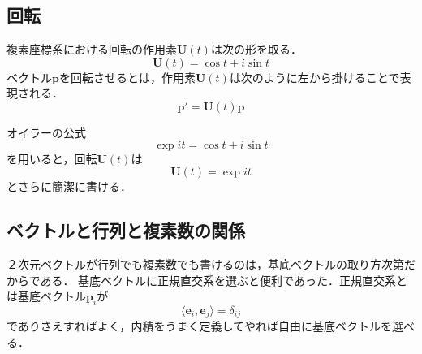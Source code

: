 \documentclass{jsbook}
\newcommand{\bvec}[1]{\boldsymbol{#1}}
\newcommand{\bop}[1]{\boldsymbol{#1}}
\newcommand{\im}{i}%
\newcommand{\ve}{\bvec{e}}
\begin{document}
\subsection{回転}

複素座標系における回転の作用素$\bop{U}(t)$は次の形を取る．
\begin{equation}
\bop{U}(t)=\cos t+\im\sin t
\end{equation}
%
%
ベクトル$\bvec{p}$を回転させるとは，作用素$\bop{U}(t)$は次のように左から掛けることで表現される．
\begin{equation}
\bvec{p}'=\bop{U}(t)\bvec{p}
\end{equation}

オイラーの公式
\begin{equation}
\exp\im t=\cos t+\im\sin t
\end{equation}
を用いると，回転$\bop{U}(t)$は
\begin{equation}
\bop{U}(t)=\exp\im t
\end{equation}
とさらに簡潔に書ける．

\subsection{ベクトルと行列と複素数の関係}

２次元ベクトルが行列でも複素数でも書けるのは，基底ベクトルの取り方次第だからである．
基底ベクトルに正規直交系を選ぶと便利であった．正規直交系とは基底ベクトル$\bvec{p}_i$が
\begin{equation}
\langle\ve_i,\ve_j\rangle=\delta_{ij}
\end{equation}
でありさえすればよく，内積をうまく定義してやれば自由に基底ベクトルを選べる．
\end{document}

